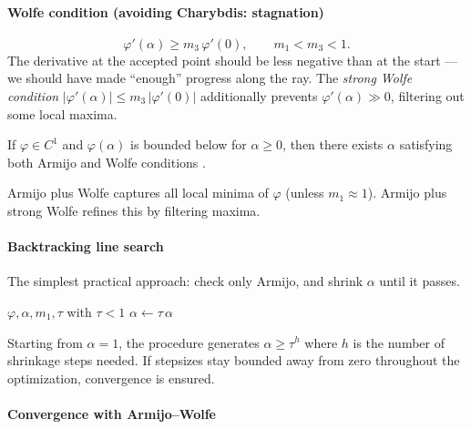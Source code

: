 \paragraph{Wolfe condition (avoiding Charybdis: stagnation)}

\begin{equation}\label{eq:wolfe}
	\varphi'(\alpha) \geq m_3\, \varphi'(0),
	\qquad m_1 < m_3 < 1.
\end{equation}
The derivative at the accepted point should be less negative than at the start --- we should have made ``enough'' progress along the ray.
The \textit{strong Wolfe condition} $|\varphi'(\alpha)| \leq m_3\, |\varphi'(0)|$ additionally prevents $\varphi'(\alpha) \gg 0$, filtering out some local maxima.

\begin{thm}\label{thm:aw-exist}
	If $\varphi \in C^1$ and $\varphi(\alpha)$ is bounded below for $\alpha \geq 0$, then there exists $\alpha$ satisfying both Armijo and Wolfe conditions \cite{nocedal2006}.
\end{thm}

Armijo plus Wolfe captures all local minima of $\varphi$ (unless $m_1 \approx 1$).
Armijo plus strong Wolfe refines this by filtering maxima.

\paragraph{Backtracking line search}

The simplest practical approach: check only Armijo, and shrink $\alpha$ until it passes.

\begin{algorithm}
	\caption{Backtracking Line Search (BLS)}
	\begin{algorithmic}[1]
		\Require $\varphi, \alpha, m_1, \tau$ with $\tau < 1$
				\State $\alpha \gets \tau\, \alpha$
			\EndWhile
		\EndProcedure
	\end{algorithmic}
\end{algorithm}

Starting from $\alpha = 1$, the procedure generates $\alpha \geq \tau^h$ where $h$ is the number of shrinkage steps needed.
If stepsizes stay bounded away from zero throughout the optimization, convergence is ensured.

\paragraph{Convergence with Armijo--Wolfe}

